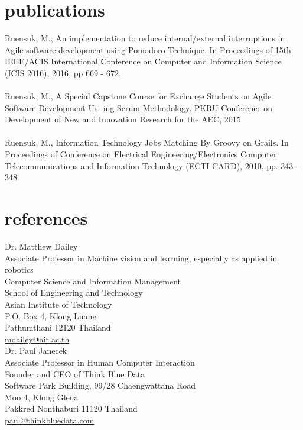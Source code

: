 \documentclass[]{friggeri-cv} %
\begin{document}
\section{publications}
Ruensuk, M., An implementation to reduce internal/external interruptions in Agile software development using Pomodoro Technique. In Proceedings of 15th IEEE/ACIS International Conference on Computer and Information Science (ICIS 2016), 2016, pp 669 - 672.\\ \\
Ruensuk, M., A Special Capstone Course for Exchange Students on Agile Software Development Us- ing Scrum Methodology. PKRU Conference on Development of New and Innovation Research for the AEC, 2015\\ \\
Ruensuk, M., Information Technology Jobs Matching By Groovy on Grails. In Proceedings of Conference on Electrical Engineering/Electronics Computer Telecommunications and Information Technology (ECTI-CARD), 2010, pp. 343 - 348.\\

\section{references}
Dr. Matthew Dailey\\
Associate Professor in Machine vision and learning, especially as applied in robotics \\
Computer Science and Information Management\\
School of Engineering and Technology\\
Asian Institute of Technology\\
P.O. Box 4, Klong Luang\\
Pathumthani 12120 Thailand\\ 
\href{mailto:mdailey@ait.ac.th}{mdailey@ait.ac.th}\\

Dr. Paul Janecek\\
Associate Professor in Human Computer Interaction\\
Founder and CEO of Think Blue Data \\
Software Park Building, 99/28 Chaengwattana Road\\
Moo 4, Klong Gleua \\
Pakkred Nonthaburi 11120 Thailand\\
\href{mailto:paul@thinkbluedata.com}{paul@thinkbluedata.com}
\end{document}
